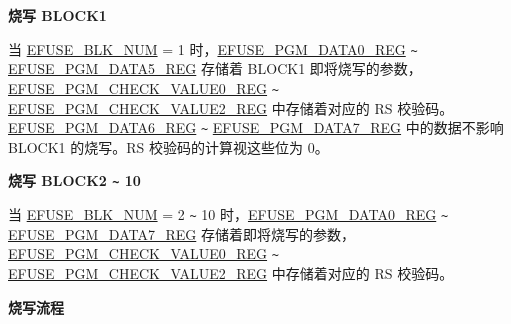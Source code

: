 \documentclass[main\_\_CN.tex]{subfiles}
\begin{document}
{\bfseries 烧写 BLOCK1}

当 \hyperref[fielddesc:EFUSEBLKNUM]{EFUSE\_BLK\_NUM} = 1 时，\hyperref[regdesc:EFUSEPGMDATA0REG]{EFUSE\_PGM\_DATA0\_REG} \verb+~+ \hyperref[regdesc:EFUSEPGMDATA5REG]{EFUSE\_PGM\_DATA5\_REG} 存储着 BLOCK1 即将烧写的参数，\hyperref[regdesc:EFUSEPGMCHECKVALUE0REG]{EFUSE\_PGM\_CHECK\_VALUE0\_REG} \verb+~+ \hyperref[regdesc:EFUSEPGMCHECKVALUE2REG]{EFUSE\_PGM\_CHECK\_VALUE2\_REG} 中存储着对应的 RS 校验码。\hyperref[regdesc:EFUSEPGMDATA6REG]{EFUSE\_PGM\_DATA6\_REG} \verb+~+ \hyperref[regdesc:EFUSEPGMDATA7REG]{EFUSE\_PGM\_DATA7\_REG} 中的数据不影响 BLOCK1 的烧写。RS 校验码的计算视这些位为 0。

{\bfseries 烧写 BLOCK2 \verb+~+ 10}

当 \hyperref[fielddesc:EFUSEBLKNUM]{EFUSE\_BLK\_NUM} = 2 \verb+~+ 10 时，\hyperref[regdesc:EFUSEPGMDATA0REG]{EFUSE\_PGM\_DATA0\_REG} \verb+~+ \hyperref[regdesc:EFUSEPGMDATA7REG]{EFUSE\_PGM\_DATA7\_REG} 存储着即将烧写的参数，\hyperref[regdesc:EFUSEPGMCHECKVALUE0REG]{EFUSE\_PGM\_CHECK\_VALUE0\_REG}  \verb+~+ \hyperref[regdesc:EFUSEPGMCHECKVALUE2REG]{EFUSE\_PGM\_CHECK\_VALUE2\_REG} 中存储着对应的 RS 校验码。

{\bfseries 烧写流程}
\end{document}
